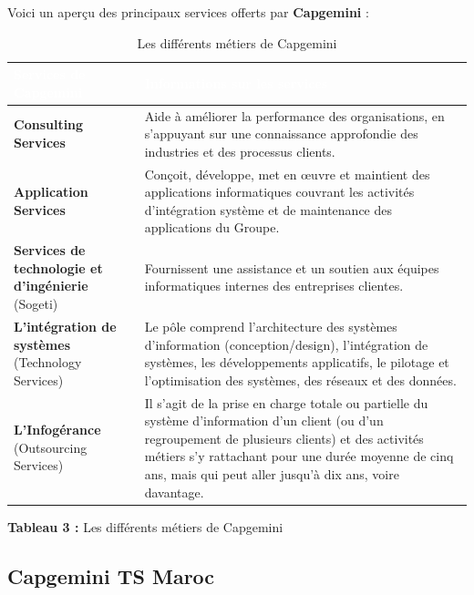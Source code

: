 \documentclass[12pt,a4paper]{report}
\begin{document}
Voici un aperçu des principaux services offerts par \textbf{Capgemini} :

\begin{longtable}[]{@{}
  >{\raggedright\arraybackslash}p{}
  >{\raggedright\arraybackslash}p{}@{}}
\caption{Les différents métiers de Capgemini}
\label{tab:capgemini-metiers}\\
\toprule
\cellcolor{capgeminiblue}\textcolor{white}{\textbf{Services de Capgemini}} &
\cellcolor{capgeminiblue}\textcolor{white}{\textbf{Informations sur les services}} \\
\midrule
\endhead
\endhead
\rowcolor{lightgray}
\textbf{Consulting Services} & Aide à améliorer la performance des organisations, en s'appuyant sur une connaissance approfondie des industries et des processus clients. \\
\textbf{Application Services} & Conçoit, développe, met en œuvre et maintient des applications informatiques couvrant les activités d'intégration système et de maintenance des applications du Groupe. \\
\rowcolor{lightgray}
\textbf{Services de technologie et d'ingénierie} (Sogeti) & Fournissent une assistance et un soutien aux équipes informatiques internes des entreprises clientes. \\
\textbf{L'intégration de systèmes} (Technology Services) & Le pôle comprend l'architecture des systèmes d'information (conception/design), l'intégration de systèmes, les développements applicatifs, le pilotage et l'optimisation des systèmes, des réseaux et des données. \\
\rowcolor{lightgray}
\textbf{L'Infogérance} (Outsourcing Services) & Il s'agit de la prise en charge totale ou partielle du système d'information d'un client (ou d'un regroupement de plusieurs clients) et des activités métiers s'y rattachant pour une durée moyenne de cinq ans, mais qui peut aller jusqu'à dix ans, voire davantage. \\
\bottomrule()
\end{longtable}

\begin{center}
\textbf{Tableau 3 :} Les différents métiers de Capgemini
\end{center}

\subsection{Capgemini TS Maroc}
\end{document}

